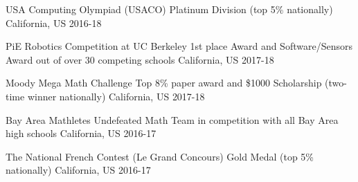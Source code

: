 



\begin{cvhonors}
  
  \cvhonor
    {USA Computing Olympiad (USACO)} %
    {Platinum Division (top 5\% nationally)}
    {California, US} %
    {2016-18} %
    
  \cvhonor
    {PiE Robotics Competition at UC Berkeley}  %
    {1st place Award and Software/Sensors Award out of over 30 competing schools}
    {California, US} %
    {2017-18} %

  \cvhonor
    {Moody Mega Math Challenge} %
    {Top 8\% paper award and \$1000 Scholarship (two-time winner nationally)}
    {California, US} %
    {2017-18} %
 
  \cvhonor
    {Bay Area Mathletes} %
    {Undefeated Math Team in competition with all Bay Area high schools}
    {California, US} %
    {2016-17} %

  \cvhonor
    {The National French Contest (Le Grand Concours)} %
    {Gold Medal (top 5\% nationally)}
    {California, US} %
    {2016-17} %
      
\end{cvhonors}
